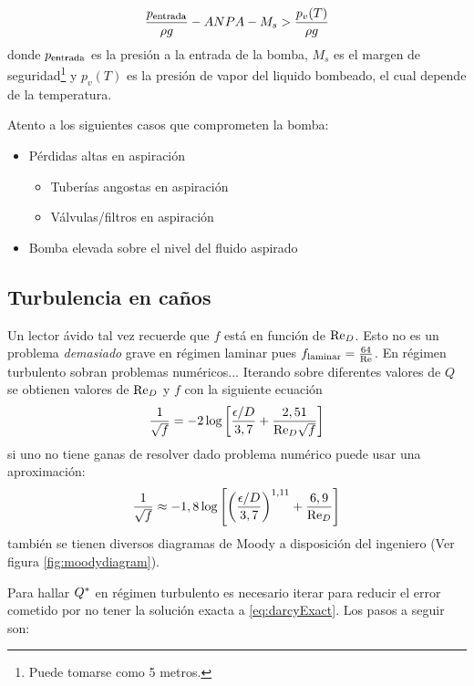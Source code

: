 \begin{equation} \label{eq:ANPA}
    \frac{p_{\entrada}}{\rho g} - ANPA - M_s > \frac{p_v(T)}{\rho g}
\end{equation}
donde $p_\entrada$ es la presión a la entrada de la bomba, $M_s$ es el margen de seguridad\footnote{Puede tomarse como 5 metros.} y $p_v(T)$ es la presión de vapor del liquido bombeado, el cual depende de la temperatura. 

Atento a los siguientes casos que comprometen la bomba:
\begin{itemize}
    \item Pérdidas altas en aspiración
    \begin{itemize}
        \item Tuberías angostas en aspiración
        \item Válvulas/filtros en aspiración
    \end{itemize}
    \item Bomba elevada sobre el nivel del fluido aspirado
\end{itemize}
\subsection{Turbulencia en caños}
Un lector ávido tal vez recuerde que $f$ está en función de $\textrm{Re}_D$. Esto no es un problema \textit{demasiado} grave en régimen laminar pues $f_{\textrm{laminar}}=\frac{64}{\textrm{Re}}$. En régimen turbulento sobran problemas numéricos...  Iterando sobre diferentes valores de $Q$ se obtienen valores de $\textrm{Re}_D$ y $f$ con la siguiente ecuación
\begin{equation} \label{eq:darcyExact}
    \frac{1}{\sqrt{f}}=-2\log \left[ \frac{\epsilon/D}{3,7}+\frac{2,51}{\textrm{Re}_D \sqrt{f}} \right]
\end{equation}
si uno no tiene ganas de resolver dado problema numérico puede usar una aproximación:
\[
\frac{1}{\sqrt{f}}\approx -1,8\log \left[ \left(\frac{\epsilon/D}{3,7}\right)^{1,11}+\frac{6,9}{\textrm{Re}_D}\right]
\]
también se tienen diversos diagramas de Moody a disposición del ingeniero (Ver figura \ref{fig:moodydiagram}).

Para hallar ${Q^{*}}$ en régimen turbulento es necesario iterar para reducir el error cometido por no tener la solución exacta a \eqref{eq:darcyExact}. Los pasos a seguir son:

